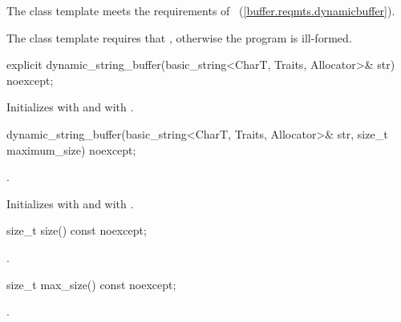 \pnum
The  class template meets the requirements of ~(\ref{buffer.reqmts.dynamicbuffer}).

\pnum
The  class template requires that , otherwise the program is ill-formed.

%
\begin{itemdecl}
explicit dynamic_string_buffer(basic_string<CharT, Traits, Allocator>& str) noexcept;
\end{itemdecl}

\begin{itemdescr}
\pnum
\effects Initializes  with  and  with .
\end{itemdescr}

%
\begin{itemdecl}
dynamic_string_buffer(basic_string<CharT, Traits, Allocator>& str,
                      size_t maximum_size) noexcept;
\end{itemdecl}

\begin{itemdescr}
\pnum
\expects {}.

\pnum
\effects Initializes  with  and  with .
\end{itemdescr}

%
\begin{itemdecl}
size_t size() const noexcept;
\end{itemdecl}

\begin{itemdescr}
\pnum
\returns {}.
\end{itemdescr}

%
\begin{itemdecl}
size_t max_size() const noexcept;
\end{itemdecl}

\begin{itemdescr}
\pnum
\returns {}.
\end{itemdescr}

